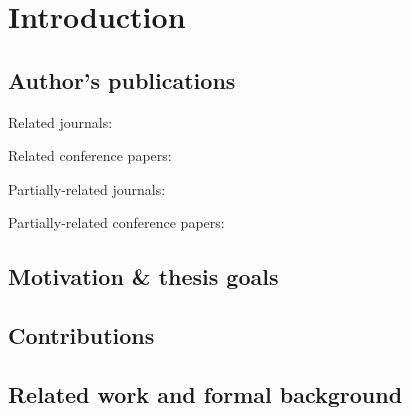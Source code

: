 \documentclass[a4paper,11pt,titlepage,twoside]{book}
\newcommand{\chapternoclear}[1]{
  \begingroup
  \let\cleardoublepage\clearpage
  \chapter{#1}
  \endgroup
}
\begin{document}


\pagestyle{fancy}

\tableofcontents



\chapternoclear{Introduction}


\section{Author's publications}


Related journals:
\cite{baca2018rospix}
\cite{baca2019autonomous}
\cite{spurny2019cooperative}
\cite{saska2017system}
\cite{giernacky2019realtime}
\cite{chudoba2016exploration}
\cite{saska2020formation}
\cite{loianno2018localization}
\cite{petrlik2020robust}
\cite{stibinger2020localization}
\cite{saikin2020wildfire}
\cite{baca2020mrs}

Related conference papers:
\cite{baca2019timepix}
\cite{baca2018model}
\cite{baca2016embedded}
\cite{baca2017autonomous}
\cite{saska2017documentation}
\cite{spurny2016complex}
\cite{faigl2017onsolution}
\cite{saska2016formations}
\cite{roucek2019darpa}

Partially-related journals:
\cite{baca2016miniaturized}
\cite{baca2018timepix}
\cite{daniel2019inorbit}
\cite{urban2017vzlusat}

Partially-related conference papers:
\cite{daniel2016terrestrial}
\cite{daniel2017xray}


\section{Motivation \& thesis goals}

\section{Contributions}


\section{Related work and formal background}
\end{document}
